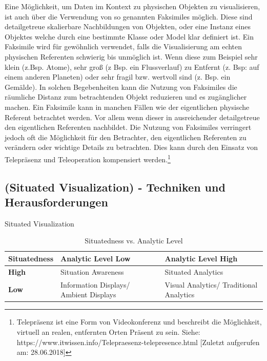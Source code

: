 \cite{WesleyWillettYvonneJansen}Eine Möglichkeit, um Daten im Kontext zu physischen Objekten zu visualisieren, ist auch über die Verwendung von so genannten Faksimiles möglich. Diese sind detailgetreue skalierbare Nachbildungen von Objekten, oder eine Instanz eines Objektes welche durch eine bestimmte Klasse oder Model klar definiert ist. Ein Faksimile wird für gewöhnlich verwendet, falls die Visualisierung am echten physischen Referenten schwierig bis unmöglich ist. Wenn diese zum Beispiel sehr klein (z.Bsp. Atome), sehr groß (z Bsp. ein Flussverlauf) zu Entfernt (z. Bsp: auf einem anderen Planeten) oder sehr fragil bzw. wertvoll sind
(z. Bsp. ein Gemälde). 
In solchen Begebenheiten kann die Nutzung von Faksimiles die räumliche Distanz zum betrachtenden Objekt
reduzieren und es zugänglicher machen. Ein Faksimile kann in manchen Fällen wie der eigentlichen physische 
Referent betrachtet werden. Vor allem wenn dieser in ausreichender detailgetreue den eigentlichen Referenten nachbildet.
Die Nutzung von Faksimiles verringert jedoch oft die Möglichkeit für den Betrachter, den eigentlichen
Referenten zu verändern oder wichtige Details zu betrachten. Dies kann durch den Einsatz von Telepräsenz und 
Teleoperation kompensiert werden.\footnote{Telepräsenz ist eine Form von Videokonferenz und beschreibt die Möglichkeit, virtuell an realen, entfernten Orten Präsent zu sein. Siehe: https://www.itwissen.info/Telepraesenz-telepresence.html [Zuletzt aufgerufen am: 28.06.2018]}

\subsection{(Situated Visualization) - Techniken und Herausforderungen}

Situated Visualization 



\begin{table}[htbp]
	\caption{Situatedness vs. Analytic Level}
	\begin{center}
		\begin{tabular}{|l|l|l|}
			\hline
			\textbf{Situatedness}& \textbf{Analytic Level Low} & \textbf{Analytic Level High}\\
			\hline
			\textbf{High } & Situation Awareness & Situated Analytics \\
			\hline
			\textbf{Low} & Information Displays/ Ambient Displays & Visual Analytics/ Traditional Analytics \\
			\hline
		\end{tabular}
	\end{center}
	\label{tab:categorycscw}
\end{table}


